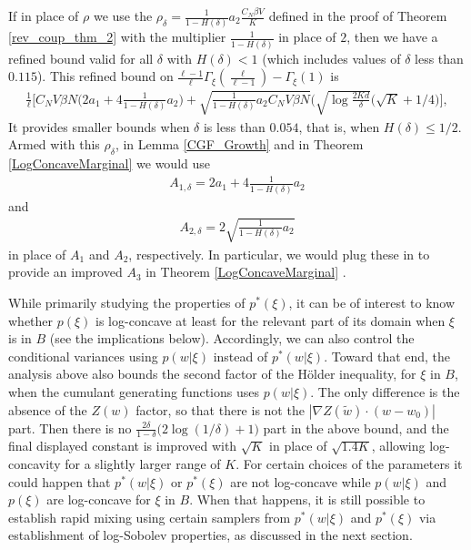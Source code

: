 \documentclass{article}
\numberwithin{equation}{section}
\theoremstyle{Lemma}
\theoremstyle{Corollary}
\theoremstyle{Theorem}
\theoremstyle{Remark}
\begin{document}
If in place of $\rho$ we use the $\rho_\delta = \tfrac{1}{1-H(\delta)} a_2 \tfrac{C_N \beta V}{K}$ defined in the proof of Theorem \ref{rev_coup_thm_2} with the multiplier $\tfrac{1}{1-H(\delta)}$ in place of $2$, then we have a refined bound valid for all $\delta$ with $H(\delta)<1$ (which includes values of $\delta$ less than $0.115$).  This refined bound on $\frac{\ell-1}{\ell}\Gamma_{\xi}(\frac{\ell}{\ell-1})-\Gamma_{\xi}(1)$ is
\begin{align}
\frac{1}{\ell} \Big[ C_{N}V\beta N\big(2a_{1}+4\tfrac{1}{1-H(\delta)} a_{2}\big)+\sqrt{\tfrac{1}{1-H(\delta)} a_2 C_{N}V\beta N}\Big(\sqrt{\log \frac{2Kd}{\delta}}(\sqrt{K}+1/4\Big)\Big],
\end{align}
It provides smaller bounds when $\delta$ is less than $0.054$, that is, when $H(\delta)\le 1/2$. Armed with this $\rho_\delta$, in Lemma \ref{CGF_Growth} and in Theorem \ref{LogConcaveMarginal} we would use 
\begin{align}
A_{1,\delta}  = 2a_{1}+4\frac{1}{1-H(\delta)} a_{2}
\end{align}
and 
\begin{align}
A_{2,\delta} = 2 \sqrt{\frac{1}{1-H(\delta)} a_2}
\end{align}
in place of $A_1$ and $A_2$, respectively. In particular, we would plug these in to provide an improved $A_3$ in Theorem  \ref{LogConcaveMarginal} .


While primarily studying the properties of $p^*(\xi)$, it can be of interest to know whether $p(\xi)$ is log-concave at least for the relevant part of its domain when $\xi$ is in $B$ (see the implications below). Accordingly, we can also control the conditional variances using $p(w|\xi)$ instead of $p^*(w|\xi)$.  Toward that end, the analysis above also bounds the second factor of the H{\"o}lder inequality, for $\xi$ in $B$, when the cumulant generating functions uses $p(w|\xi)$.  The only difference is the absence of the $Z(w)$ factor, so that there is not the $|\nabla Z(\tilde w)\cdot (w-w_0)|$ part.  Then there is no  $ \frac{2\delta}{1-\delta}\big(2\log(1/\delta) +1\big)$ part in the above bound, and the final displayed constant is improved with $\sqrt{K}$ in place of $\sqrt{1.4K}$, allowing log-concavity for a slightly larger range of $K$. For certain choices of the parameters it could happen that $p^*(w|\xi)$ or $p^*(\xi)$ are not log-concave while $p(w|\xi)$ and $p(\xi)$ are log-concave for $\xi$ in $B$. When that happens, it is still possible to establish rapid mixing using certain samplers from $p^*(w|\xi)$ and $p^*(\xi)$ via establishment of log-Sobolev properties, as discussed in the next section.
\end{document}
